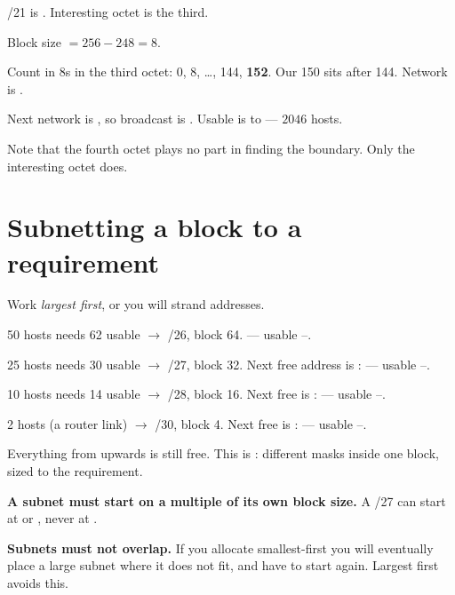 \begin{worked}
\begin{tightnum}
  \item /21 is . Interesting octet is the third.
  \item Block size $= 256 - 248 = 8$.
  \item Count in 8s in the third octet: 0, 8, \ldots, 144, \textbf{152}. Our 150
        sits after 144. Network is .
  \item Next network is , so broadcast is
        . Usable is  to
         --- $2046$ hosts.
\end{tightnum}
Note that the fourth octet plays no part in finding the boundary. Only the
interesting octet does.
\end{worked}

\section{Subnetting a block to a requirement}

\begin{worked}
Work \emph{largest first}, or you will strand addresses.

\begin{tightnum}
  \item 50 hosts needs 62 usable $\rightarrow$ /26, block 64.
         --- usable --.
  \item 25 hosts needs 30 usable $\rightarrow$ /27, block 32. Next free address
        is :  --- usable --.
  \item 10 hosts needs 14 usable $\rightarrow$ /28, block 16. Next free is
        :  --- usable --.
  \item 2 hosts (a router link) $\rightarrow$ /30, block 4. Next free is
        :  --- usable --.
\end{tightnum}
Everything from  upwards is still free. This is : different
masks inside one block, sized to the requirement.
\end{worked}

\begin{alertbox}
\begin{tight}
  \item \textbf{A subnet must start on a multiple of its own block size.} A /27
        can start at  or , never at .
  \item \textbf{Subnets must not overlap.} If you allocate smallest-first you
        will eventually place a large subnet where it does not fit, and have to
        start again. Largest first avoids this.
\end{tight}
\end{alertbox}

